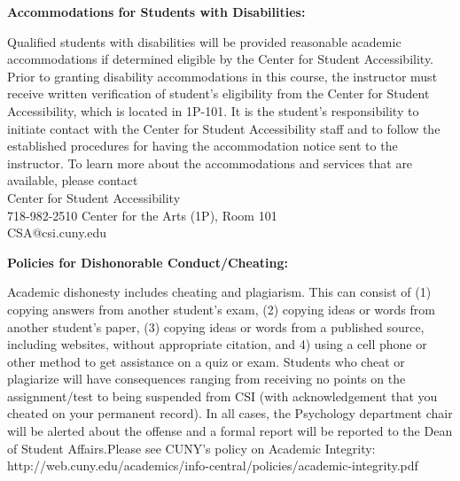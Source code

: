 \documentclass[11pt]{article}
\begin{document}
\textbf{Accommodations for Students with Disabilities: }

\hspace{3mm}
\hangindent=5mm Qualified students with disabilities will be provided reasonable academic accommodations if determined eligible by the Center for Student Accessibility. Prior to granting disability accommodations in this course, the instructor must receive written verification of student’s eligibility from the Center for Student Accessibility, which is located in 1P-101. It is the student’s responsibility to initiate contact with the Center for Student Accessibility staff and to follow the established procedures for having the accommodation notice sent to the instructor.
To learn more about the accommodations and services that are available, please contact
\\
Center for Student Accessibility \\ 718-982-2510
Center for the Arts (1P), Room 101 \\ CSA@csi.cuny.edu


\textbf{Policies for Dishonorable Conduct/Cheating:}

\hspace{3mm}
\hangindent=5mm 
Academic dishonesty includes cheating and plagiarism. This can consist of (1) copying answers from another student's exam, (2) copying ideas or words from another student's paper, (3) copying ideas or words from a published source, including websites, without appropriate citation, and 4) using a cell phone or other method to get assistance on a quiz or exam. Students who cheat or plagiarize will have consequences ranging from receiving no points on the assignment/test to being suspended from CSI (with acknowledgement that you cheated on your permanent record). In all cases, the Psychology department chair will be alerted about the offense and a formal report will be reported to the Dean of Student Affairs.Please see CUNY’s policy on Academic Integrity: http://web.cuny.edu/academics/info-central/policies/academic-integrity.pdf
\end{document}
